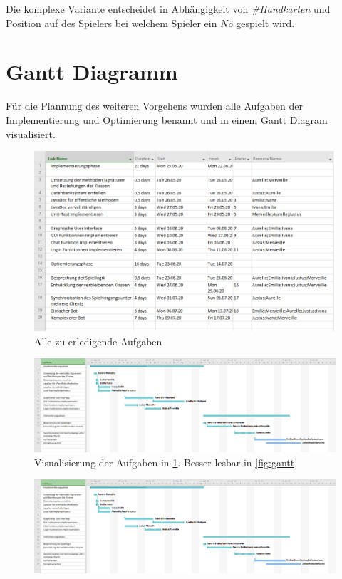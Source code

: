 \documentclass[11pt, a4paper, oneside]{memoir}                                                      %
\begin{document}
        Die komplexe Variante entscheidet in Abhängigkeit von \textit{\#Handkarten} und Position auf des Spielers bei welchem Spieler ein \textit{Nö} gespielt wird.

    \clearpage

    \section{Gantt Diagramm}
        Für die Plannung des weiteren Vorgehens wurden alle Aufgaben der Implementierung und Optimierung benannt und in einem Gantt Diagram visualisiert.

        \begin{figure}[h]
			\centering
			\includegraphics[scale=0.6]{../img/Gantt_Diagramm/task.png}
            \caption{Alle zu erledigende Aufgaben}
            \label{fig:auf}
        \end{figure} 

        \begin{figure}[h]
			\centering
			\includegraphics[scale=0.3]{../img/Gantt_Diagramm/task_and_graph.png}
            \caption{Visualisierung der Aufgaben in \ref{fig:auf}. Besser lesbar in \ref{fig:gantt}}
        \end{figure} 

        \begin{figure}[h]
			\centering
			\includegraphics[scale=0.5, angle=-90]{../img/Gantt_Diagramm/task_and_graph.png}
        \end{figure}
        \label{fig:gantt}
\end{document}
